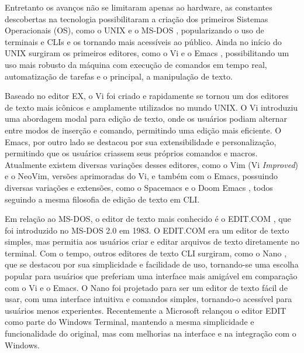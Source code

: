 Entretanto os avanços não se limitaram apenas ao hardware, as constantes descobertas
na tecnologia possibilitaram a criação dos primeiros Sistemas Operacionais (OS),
como o UNIX \cite{UnixArchive} e o MS-DOS \cite{ComputerHistoryMuseum}, popularizando
o uso de terminais e CLIs e os tornando mais acessíveis ao público. Ainda no
início do UNIX surgiram os primeiros editores, como o Vi \cite{Joy_Vi} e o Emacs
\cite{Stallman1981}, possibilitando um uso mais robusto da máquina com execução
de comandos em tempo real, automatização de tarefas e o principal, a manipulação
de texto.

Baseado no editor EX, o Vi foi criado e rapidamente se tornou um dos editores de
texto mais icônicos e amplamente utilizados no mundo UNIX. O Vi introduziu uma
abordagem modal para edição de texto, onde os usuários podiam alternar entre modos
de inserção e comando, permitindo uma edição mais eficiente. O Emacs, por outro
lado se destacou por sua extensibilidade e personalização, permitindo que os usuários
criassem seus próprios comandos e macros. Atualmente existem diversas variações
desses editores, como o Vim (Vi \textit{Improved}) \cite{Vim} e o NeoVim,
\cite{Neovim_Project} versões aprimoradas do Vi, e também com o Emacs, possuindo
diversas variações e extensões, como o Spacemacs \cite{Spacemacs} e o Doom Emacs
\cite{DoomEmacs}, todos seguindo a mesma filosofia de edição de texto em CLI.

Em relação ao MS-DOS, o editor de texto mais conhecido é o EDIT.COM \cite{MicrosoftEdit2025},
que foi introduzido no MS-DOS 2.0 em 1983. O EDIT.COM era um editor de texto
simples, mas permitia aos usuários criar e editar arquivos de texto diretamente no
terminal. Com o tempo, outros editores de texto CLI surgiram, como o Nano
\cite{Nano2025}, que se destacou por sua simplicidade e facilidade de uso,
tornando-se uma escolha popular para usuários que preferiam uma interface mais
amigável em comparação com o Vi e o Emacs. O Nano foi projetado para ser um editor
de texto fácil de usar, com uma interface intuitiva e comandos simples, tornando-o
acessível para usuários menos experientes. Recentemente a Microsoft relançou o
editor EDIT como parte do Windows Terminal, mantendo a mesma simplicidade e funcionalidade
do original, mas com melhorias na interface e na integração com o Windows.

